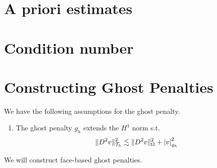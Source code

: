 
\newpage
\section{A priori estimates}%
\label{sec:a_priori_estimates}

\newpage
\section{Condition number}%
\label{sec:condition_number}


\newpage
\section{Constructing Ghost Penalties}%
\label{sec:constructing_ghost_penalties}

We have the following assumptions for the ghost penalty.
\begin{enumerate}[label=\textbf{EP\arabic*}]
    \item\label{as:EP1} The ghost penalty $g_{h}$ extends the $H^{1}$ norm s.t. \[
    \| D^2v \|_{ \mathcal{T} _{h} }^{ 2 }  \lesssim \| D^2 v \|_{ \Omega  }^{  2} + \left\lvert  v  \right\rvert _{g_{h}}^2
    \]
\end{enumerate}


We will construct face-based ghost penalties.

